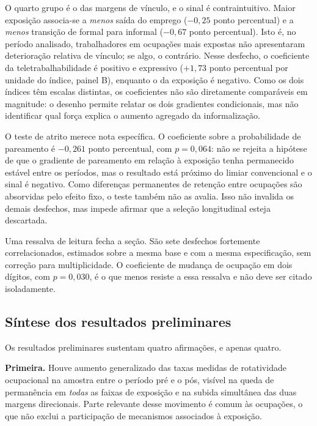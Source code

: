 O quarto grupo é o das margens de vínculo, e o sinal é contraintuitivo. Maior
exposição associa-se a \emph{menos} saída do emprego ($-0{,}25$ ponto
percentual) e a \emph{menos} transição de formal para informal ($-0{,}67$ ponto
percentual). Isto é, no período analisado, trabalhadores em ocupações mais
expostas não apresentaram deterioração relativa de vínculo; se algo, o contrário.
Nesse desfecho, o coeficiente da teletrabalhabilidade é positivo e expressivo
($+1{,}73$ ponto percentual por unidade do índice, painel B), enquanto o da
exposição é negativo. Como os dois índices têm escalas distintas, os
coeficientes não são diretamente comparáveis em magnitude: o desenho permite
relatar os dois gradientes condicionais, mas não identificar qual força explica
o aumento agregado da informalização.

O teste de atrito merece nota específica. O coeficiente sobre a probabilidade de
pareamento é $-0{,}261$ ponto percentual, com $p = 0{,}064$: não se rejeita a hipótese de que o gradiente de pareamento em relação à
exposição tenha permanecido estável entre os períodos, mas o resultado está
próximo do limiar convencional e o sinal é negativo. Como diferenças
permanentes de retenção entre ocupações são absorvidas pelo efeito fixo, o teste
também não as avalia. Isso não invalida os demais desfechos, mas impede afirmar
que a seleção longitudinal esteja descartada.

Uma ressalva de leitura fecha a seção. São sete desfechos fortemente
correlacionados, estimados sobre a mesma base e com a mesma especificação, sem
correção para multiplicidade. O coeficiente de mudança de ocupação em dois
dígitos, com $p = 0{,}030$, é o que menos resiste a essa ressalva e não deve ser
citado isoladamente.

\subsection{Síntese dos resultados preliminares}

Os resultados preliminares sustentam quatro afirmações, e apenas quatro.

\textbf{Primeira.} Houve aumento generalizado das taxas medidas de rotatividade
ocupacional na amostra entre o período pré e o pós, visível na queda de
permanência em \emph{todas} as faixas de exposição e na subida simultânea das
duas margens direcionais. Parte relevante desse movimento é comum às ocupações,
o que não exclui a participação de mecanismos associados à exposição.

